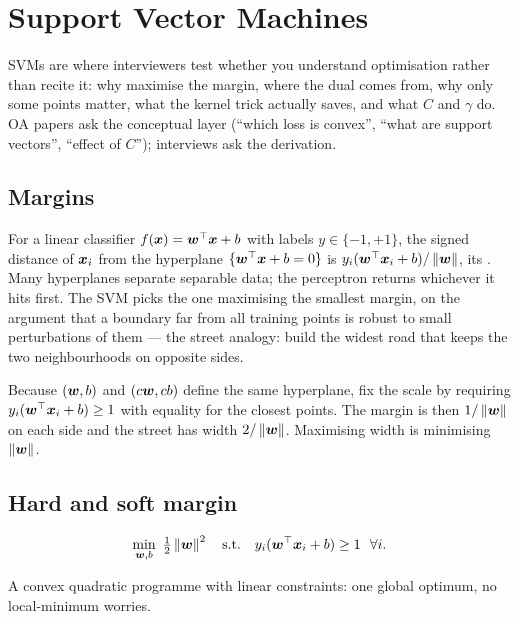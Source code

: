 \chapter{Support Vector Machines}
\label{ch:svm}
SVMs are where interviewers test whether you understand optimisation rather than recite it: why
maximise the margin, where the dual comes from, why only some points matter, what the kernel trick
actually saves, and what $C$ and $\gamma$ do. OA papers ask the conceptual layer (``which loss is
convex'', ``what are support vectors'', ``effect of $C$''); interviews ask the derivation.

\section{Margins}

For a linear classifier $f({\bm{x}})={\bm{w}}^{\top}{\bm{x}}+b$ with labels $y\in\{-1,+1\}$, the signed distance of
${\bm{x}}_i$ from the hyperplane $\{{\bm{w}}^{\top}{\bm{x}}+b=0\}$ is $y_i({\bm{w}}^{\top}{\bm{x}}_i+b)/\left\lVert {\bm{w}} \right\rVert$, its . Many hyperplanes separate separable data; the perceptron returns whichever it hits
first. The SVM picks the one maximising the smallest margin, on the argument that a boundary far
from all training points is robust to small perturbations of them --- the street analogy: build the
widest road that keeps the two neighbourhoods on opposite sides.

Because $({\bm{w}},b)$ and $(c{\bm{w}},cb)$ define the same hyperplane, fix the scale by requiring
$y_i({\bm{w}}^{\top}{\bm{x}}_i+b)\ge1$ with equality for the closest points. The margin is then $1/\left\lVert {\bm{w}} \right\rVert$ on
each side and the street has width $2/\left\lVert {\bm{w}} \right\rVert$. Maximising width is minimising $\left\lVert {\bm{w}} \right\rVert$.

\section{Hard and soft margin}

\begin{definition}
	\[ \min_{\w,b}\ \tfrac12\norm{\w}^2\quad\text{s.t.}\quad y_i(\w\T\x_i+b)\ge1\ \ \forall i. \]
\end{definition}
A convex quadratic programme with linear constraints: one global optimum, no local-minimum worries.

